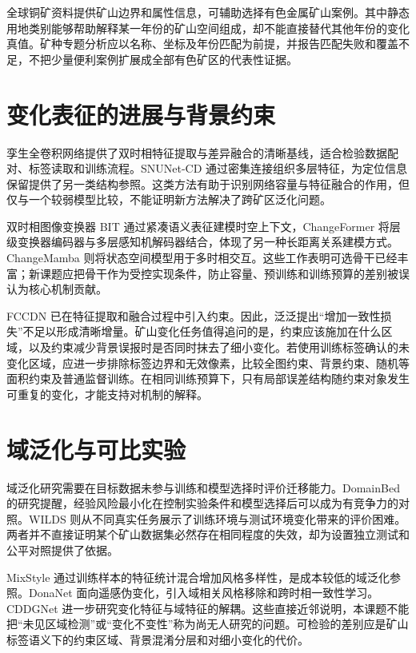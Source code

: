 \documentclass[UTF8,a4paper,11pt]{ctexart}
\begin{document}
全球铜矿资料提供矿山边界和属性信息，可辅助选择有色金属矿山案例\cite{Li2025Copper}。其中静态用地类别能够帮助解释某一年份的矿山空间组成，却不能直接替代其他年份的变化真值。矿种专题分析应以名称、坐标及年份匹配为前提，并报告匹配失败和覆盖不足，不把少量便利案例扩展成全部有色矿区的代表性证据。

\section{变化表征的进展与背景约束}
孪生全卷积网络提供了双时相特征提取与差异融合的清晰基线，适合检验数据配对、标签读取和训练流程\cite{Daudt2018Siamese}。SNUNet-CD 通过密集连接组织多层特征，为定位信息保留提供了另一类结构参照\cite{Fang2022SNUNet}。这类方法有助于识别网络容量与特征融合的作用，但仅与一个较弱模型比较，不能证明新方法解决了跨矿区泛化问题。

双时相图像变换器 BIT 通过紧凑语义表征建模时空上下文\cite{Chen2022BIT}，ChangeFormer 将层级变换器编码器与多层感知机解码器结合，体现了另一种长距离关系建模方式\cite{Bandara2022ChangeFormer}。ChangeMamba 则将状态空间模型用于多时相交互\cite{Chen2024ChangeMamba}。这些工作表明可选骨干已经丰富；新课题应把骨干作为受控实现条件，防止容量、预训练和训练预算的差别被误认为核心机制贡献。

FCCDN 已在特征提取和融合过程中引入约束\cite{Chen2022FCCDN}。因此，泛泛提出“增加一致性损失”不足以形成清晰增量。矿山变化任务值得追问的是，约束应该施加在什么区域，以及约束减少背景误报时是否同时抹去了细小变化。若使用训练标签确认的未变化区域，应进一步排除标签边界和无效像素，比较全图约束、背景约束、随机等面积约束及普通监督训练。在相同训练预算下，只有局部误差结构随约束对象发生可重复的变化，才能支持对机制的解释。

\section{域泛化与可比实验}
域泛化研究需要在目标数据未参与训练和模型选择时评价迁移能力。DomainBed 的研究提醒，经验风险最小化在控制实验条件和模型选择后可以成为有竞争力的对照\cite{Gulrajani2021DomainBed}。WILDS 则从不同真实任务展示了训练环境与测试环境变化带来的评价困难\cite{Koh2021WILDS}。两者并不直接证明某个矿山数据集必然存在相同程度的失效，却为设置独立测试和公平对照提供了依据。

MixStyle 通过训练样本的特征统计混合增加风格多样性，是成本较低的域泛化参照\cite{Zhou2021MixStyle}。DonaNet 面向遥感伪变化，引入域相关风格移除和跨时相一致性学习\cite{Zang2025DonaNet}。CDDGNet 进一步研究变化特征与域特征的解耦\cite{Zhao2026CDDG}。这些直接近邻说明，本课题不能把“未见区域检测”或“变化不变性”称为尚无人研究的问题。可检验的差别应是矿山标签语义下的约束区域、背景混淆分层和对细小变化的代价。
\end{document}
